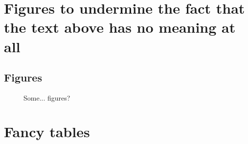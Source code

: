 \documentclass[fleqn,10pt]{olplainarticle}
\begin{document}
\newpage
\section{Figures to undermine the fact that the text above has no meaning at all}
\subsection{Figures}
\begin{figure}[h]%
    \centering
    \qquad
    \caption{Some... figures?}
    \label{fig:figures}
\end{figure}

\section{Fancy tables}
\end{document}
